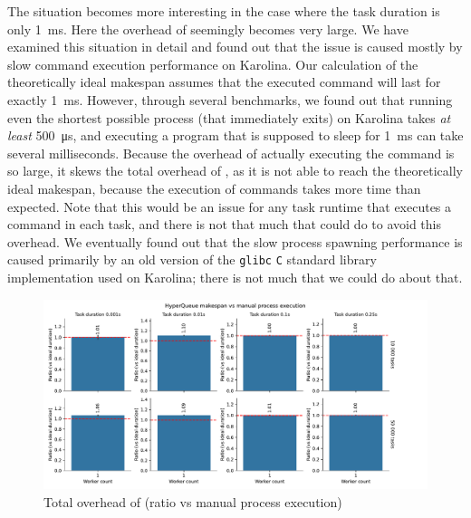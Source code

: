The situation becomes more interesting in the case where the task duration is only
\SI{1}{\milli\second}. Here the overhead of \hyperqueue{} seemingly becomes very large.
We have examined this situation in detail and found out that the issue is caused mostly by slow
command execution performance on Karolina. Our calculation of the theoretically ideal makespan
assumes that the executed command will last for exactly \SI{1}{\milli\second}. However, through
several benchmarks, we found out that running even the shortest possible process (that
immediately exits) on Karolina
takes \emph{at least}
\SI{500}{\micro\second}, and executing a program that is supposed to sleep for
\SI{1}{\milli\second} can take several milliseconds. Because the overhead of actually executing
the command is so large, it skews the total overhead of \hyperqueue{}, as it is not able
to reach the theoretically ideal makespan, because the execution of commands takes more time than
expected. Note that this would be an issue for any task runtime that executes a command in each
task, and there is not that much that \hyperqueue{} could do to avoid this overhead. We
eventually found out that the slow process spawning performance is caused primarily by an old
version of the \texttt{glibc} \texttt{C} standard library implementation used on Karolina; there
is not much that we could do about that.

\begin{figure}[h]
	\centering
	\includegraphics[width=\textwidth]{imgs/hq/charts/total-overhead-vs-manual}
	\caption{Total overhead of \hyperqueue{} (ratio vs manual process execution)}
	\label{fig:hq-overhead-vs-manual}
\end{figure}

